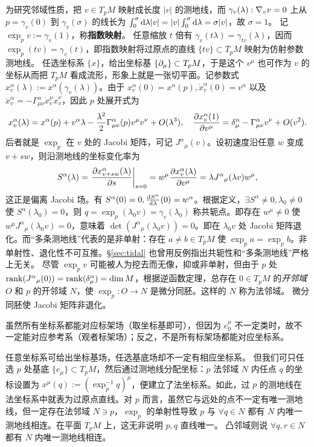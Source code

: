 为研究邻域性质，把 $v\in T_p M$ 映射成长度 $|v|$ 的测地线，而 $\gamma_v(\lambda) : \nabla_v v = 0$ 上从 $p=\gamma_v(0)$ 到 $\gamma_v(\sigma)$ 的线长为 $\int_0^\sigma\dd\lambda|v| = |v|\int_0^\sigma\dd\lambda = \sigma|v|$，故 $\sigma=1$。
记 $\exp_p v := \gamma_v(1)$，称\textbf{指数映射}。
任意缩放 $t$ 倍有 $\gamma_v(t\lambda) = \gamma_{t v}(\lambda)$，因而 $\exp_p(t v) = \gamma_v(t)$，即指数映射将过原点的直线 $\{t v\}\subset T_p M$ 映射为仿射参数测地线。
任选坐标系 $\{x\}$，给出坐标基 $\{\partial_\mu\}\subset T_p M$，于是这个 $v^\mu$ 也可作为 $v$ 的坐标从而把 $T_p M$ 看成流形，形象上就是一张切平面。记参数式 $x^\alpha_v(\lambda):=x^\alpha(\gamma_v(\lambda))$。由于 $x^\alpha_v(0)=x^\alpha(p),\dot x^\alpha_v(0)=v^\alpha$ 以及 $\ddot x^\alpha_v = -\Gamma^\alpha_{\mu\nu}\dot x^\mu_v\dot x^\nu_v$，因此 $p$ 处展开式为
\[
    x^\alpha_v(\lambda) = x^\alpha(p) + v^\alpha\lambda - \frac{\lambda^2}{2} \Gamma^\alpha_{\mu\nu}(p)v^\mu v^\nu + O(\lambda^3),\quad \pdv{x^\alpha_v(1)}{v^\mu} = \delta^\alpha_\mu - \Gamma^\alpha_{\mu\nu}v^\nu + O(v^2).
\]
后者就是 $\exp_p$ 在 $v$ 处的 Jacobi 矩阵，可记 $J^\alpha{}_\mu(v)$。设初速度沿任意 $w$ 变成 $v+s w$，则沿测地线的坐标变化率为
\[
    S^\alpha(\lambda) = \eval{\pdv{x^\alpha_{v+sw}(\lambda)}{s}}_{s=0} = w^\mu\pdv{x^\alpha_v(\lambda)}{v^\mu} = \lambda J^\alpha{}_\mu(\lambda v)w^\mu,
\]
这正是偏离 Jacobi 场。有 $S^\alpha(0) = 0,{\dv{S^\alpha}{\lambda}}(0) = w^\alpha$。根据定义，$\exists S^\alpha\ne 0,\lambda_0\ne 0$ 使 $S^\alpha(\lambda_0)=0$，则 $q=\exp_p(\lambda_0 v) = \gamma_v(\lambda_0)$ 称共轭点。即存在 $w^\mu\ne 0$ 使 $w^\mu J^\alpha{}_\mu(\lambda_0 v) = 0$，意味着 $\det(J^\alpha{}_\mu(\lambda_0 v)) = 0$。即在 $\lambda_0 v$ 处 Jacobi 矩阵退化。而“多条测地线”代表的是非单射：存在 $a\ne b\in T_p M$ 使 $\exp_p a=\exp_p b$。非单射性、退化性不可互推。\S\ref{sec:tidal} 也曾用反例指出共轭性和“多条测地线”严格上无关。
尽管 $\exp_p v$ 可能被人为挖去而无像，抑或非单射，但由于 $p$ 处$\rank(J^\alpha{}_\mu(0))=\rank(\delta^\alpha_\mu)=\dim M$，根据逆函数定理，总存在 $0\in T_p M$ 的\textit{开邻域} $O$ 和 $p$ 的开邻域 $N$，使 $\exp_p:O\to N$ 是微分同胚。这样的 $N$ 称为法邻域。
微分同胚使 Jacobi 矩阵非退化。


虽然所有坐标系都能对应标架场（取坐标基即可），但因为 $e_0^\mu$ 不一定类时，故不一定能对应参考系（观者标架场）；反之，不是所有标架场都能对应坐标系。

任意坐标系可给出坐标基场，任选基底场却不一定有相应坐标系。
但我们可只任选 $p$ 处基底 $\{e_\mu\}\subset T_p M$，然后通过测地线分配坐标：$p$ 法邻域 $N$ 内任点 $q$ 的坐标设置为 $x^\mu(q):=(\exp_p^{-1}q)^\mu$，便建立了法坐标系。如此，过 $p$ 的测地线在法坐标系中就表为过原点直线。对 $p$ 而言，虽然它与远处的点不一定有唯一测地线，但一定存在法邻域 $N\ni p$，$\exp_p$ 的单射性导致 $p$ 与 $\forall q\in N$ 都有 $N$ 内唯一测地线相连。在平面 $T_p M$ 上，这无非说明 $p,q$ 直线唯一。
凸邻域则说 $\forall q,r\in N$ 都有 $N$ 内唯一测地线相连。

